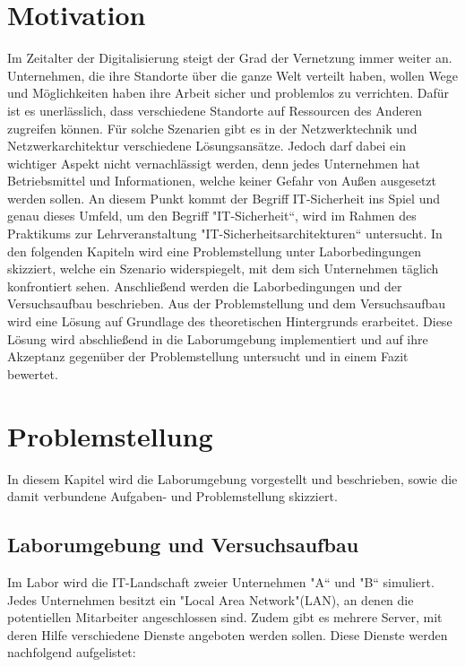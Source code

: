\documentclass[
a4paper,     %
 headsepline, %
footsepline, %
titlepage,   %
 halfparskip,     %
 fleqn,       %
12pt         %
]{scrartcl}  %
\begin{document}
\section{Motivation}
Im Zeitalter der Digitalisierung steigt der Grad der Vernetzung immer weiter an. Unternehmen, die ihre Standorte über die ganze Welt verteilt haben, wollen Wege und Möglichkeiten haben ihre Arbeit sicher und problemlos zu verrichten. Dafür ist es unerlässlich, dass verschiedene Standorte auf Ressourcen des Anderen zugreifen können. Für solche Szenarien gibt es in der Netzwerktechnik und Netzwerkarchitektur verschiedene Lösungsansätze. 
Jedoch darf dabei ein wichtiger Aspekt nicht vernachlässigt werden, denn jedes Unternehmen hat Betriebsmittel und Informationen, welche keiner Gefahr von Außen ausgesetzt werden sollen. An diesem Punkt kommt der Begriff IT-Sicherheit ins Spiel und genau dieses Umfeld, um den Begriff "IT-Sicherheit“, wird im Rahmen des Praktikums zur Lehrveranstaltung "IT-Sicherheitsarchitekturen“ untersucht. 
In den folgenden Kapiteln wird eine Problemstellung unter Laborbedingungen skizziert, welche ein Szenario widerspiegelt, mit dem sich Unternehmen täglich konfrontiert sehen. Anschließend werden die Laborbedingungen und der Versuchsaufbau beschrieben. Aus der Problemstellung und dem Versuchsaufbau wird eine Lösung auf Grundlage des theoretischen Hintergrunds erarbeitet. Diese Lösung wird abschließend in die Laborumgebung implementiert und auf ihre Akzeptanz gegenüber der Problemstellung untersucht und in einem Fazit bewertet.   
\newpage
\section{Problemstellung}
In diesem Kapitel wird die Laborumgebung vorgestellt und beschrieben, sowie die damit verbundene Aufgaben- und Problemstellung skizziert.
\subsection{Laborumgebung und Versuchsaufbau}
\label{laborumgebung}
Im Labor wird die IT-Landschaft zweier Unternehmen "A“ und "B“ simuliert. Jedes Unternehmen besitzt ein "Local Area Network"(LAN), an denen die potentiellen Mitarbeiter angeschlossen sind. Zudem gibt es mehrere Server, mit  deren Hilfe verschiedene Dienste angeboten werden sollen. 
Diese Dienste werden nachfolgend aufgelistet:
\end{document}
